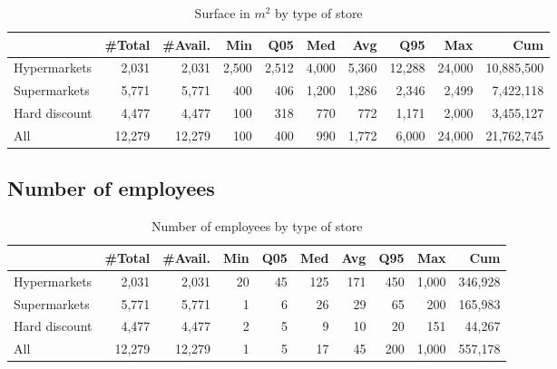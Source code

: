 \documentclass[11pt]{article}
\begin{document}
\begin{table}[H]
\caption{Surface in $m^2$ by type of store}
\small

\begin{tabular}{lrrrrrrrrr}
\toprule
{} &     \#Total &    \#Avail. &        Min &        Q05 &        Med &        Avg &        Q95 &        Max &        Cum \\
\midrule
Hypermarkets  &      2,031 &      2,031 &      2,500 &      2,512 &      4,000 &      5,360 &     12,288 &     24,000 & 10,885,500 \\
Supermarkets  &      5,771 &      5,771 &        400 &        406 &      1,200 &      1,286 &      2,346 &      2,499 &  7,422,118 \\
Hard discount &      4,477 &      4,477 &        100 &        318 &        770 &        772 &      1,171 &      2,000 &  3,455,127 \\
\midrule
All           &     12,279 &     12,279 &        100 &        400 &        990 &      1,772 &      6,000 &     24,000 & 21,762,745 \\
\bottomrule
\end{tabular}

\end{table}




\subsection{Number of employees}

\begin{table}[H]
\caption{Number of employees by type of store}
\small

\begin{tabular}{lrrrrrrrrr}
\toprule
{} &     \#Total &    \#Avail. &        Min &        Q05 &        Med &        Avg &        Q95 &        Max &        Cum \\
\midrule
Hypermarkets  &      2,031 &      2,031 &         20 &         45 &        125 &        171 &        450 &      1,000 &    346,928 \\
Supermarkets  &      5,771 &      5,771 &          1 &          6 &         26 &         29 &         65 &        200 &    165,983 \\
Hard discount &      4,477 &      4,477 &          2 &          5 &          9 &         10 &         20 &        151 &     44,267 \\
\midrule
All           &     12,279 &     12,279 &          1 &          5 &         17 &         45 &        200 &      1,000 &    557,178 \\
\bottomrule
\end{tabular}

\end{table}
\end{document}
